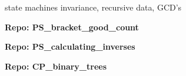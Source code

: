 \documentclass[handout]{mcs}
\begin{document}

state machines invariance, recursive data, GCD's

\newcommand{\fbt}{\text{FBT}}
\newcommand{\wlt}{\text{WLT}}
\newcommand{\tg}{\text{2PTG}}
\newcommand{\vg}{\text{VG}}


\large\textbf{Repo: PS\_bracket\_good\_count}

\large\textbf{Repo: PS\_calculating\_inverses}



\large\textbf{Repo: CP\_binary\_trees}
\end{document}
